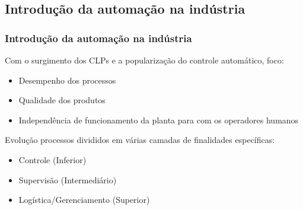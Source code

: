 \documentclass{beamer}
\begin{document}
\subsection{Introdução da automação na indústria}
\begin{frame}
    \frametitle{Introdução da automação na indústria}

    Com o surgimento dos CLPs e a popularização do controle automático, foco:

\begin{itemize}
    \item Desempenho dos processos
    \item Qualidade dos produtos 
    \item Independência de funcionamento da planta para com os operadores
          humanos
\end{itemize}

    Evolução \implica processos divididos em várias camadas de finalidades
    específicas:

\begin{itemize}
    \item Controle (Inferior)
    \item Supervisão (Intermediário)
    \item Logística/Gerenciamento (Superior)
\end{itemize}
    
\end{frame}
\end{document}
